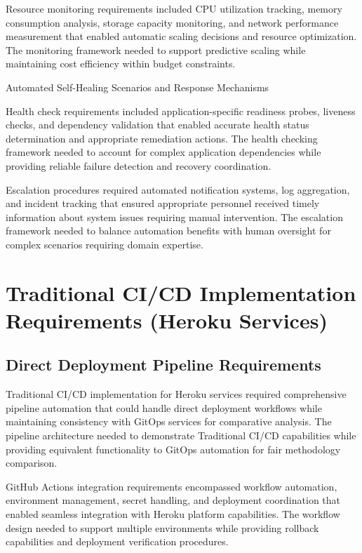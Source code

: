 Resource monitoring requirements included CPU utilization tracking, memory consumption analysis, storage capacity monitoring, and network performance measurement that enabled automatic scaling decisions and resource optimization. The monitoring framework needed to support predictive scaling while maintaining cost efficiency within budget constraints.

\begin{table}[H]
\centering
\caption{Automated Self-Healing Scenarios and Response Mechanisms}
\label{tab:self-healing-scenarios}
\end{table}

Health check requirements included application-specific readiness probes, liveness checks, and dependency validation that enabled accurate health status determination and appropriate remediation actions. The health checking framework needed to account for complex application dependencies while providing reliable failure detection and recovery coordination.

Escalation procedures required automated notification systems, log aggregation, and incident tracking that ensured appropriate personnel received timely information about system issues requiring manual intervention. The escalation framework needed to balance automation benefits with human oversight for complex scenarios requiring domain expertise.

\section{Traditional CI/CD Implementation Requirements (Heroku Services)}

\subsection{Direct Deployment Pipeline Requirements}

Traditional CI/CD implementation for Heroku services required comprehensive pipeline automation that could handle direct deployment workflows while maintaining consistency with GitOps services for comparative analysis. The pipeline architecture needed to demonstrate Traditional CI/CD capabilities while providing equivalent functionality to GitOps automation for fair methodology comparison.

GitHub Actions integration requirements encompassed workflow automation, environment management, secret handling, and deployment coordination that enabled seamless integration with Heroku platform capabilities. The workflow design needed to support multiple environments while providing rollback capabilities and deployment verification procedures.

